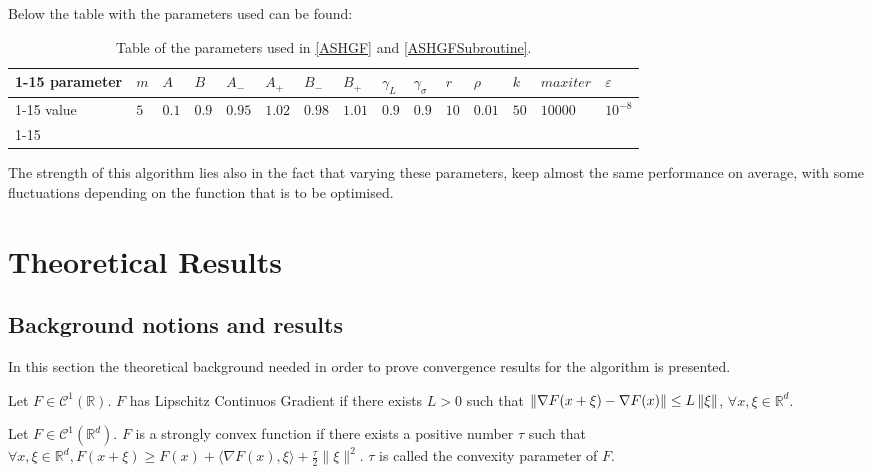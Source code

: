 Below the table with the parameters used can be found:

\begin{table}[!ht]
\hspace{-13mm}
\begin{tabular}{|l|llllllllllllll|}
\cline{1-15}
 parameter & $m$ & $A$   & $B$   & $A_-$ & $A_+$ & $B_-$ & $B_+$ & $\gamma_L$ & $\gamma_\sigma$ & $r$  & $\rho$ & $k$ & $maxiter$ & $\varepsilon$\\ \cline{1-15}
 value & $5$ & $0.1$ & $0.9$ & $0.95$ & $1.02$ & $0.98$ & $1.01$ & $0.9$ & $0.9$ & $10$ & $0.01$ & $50$ & $10000$ & $10^{-8}$            \\ \cline{1-15}
\end{tabular}
\caption[Table of the parameters.]{Table of the parameters used in \ref{ASHGF} and \ref{ASHGFSubroutine}.}
\end{table}

The strength of this algorithm lies also in the fact that varying these parameters, keep almost the same performance on average, with some fluctuations depending on the function that is to be optimised.

\section{Theoretical Results}

\subsection{Background notions and results}

In this section the theoretical background needed in order to prove convergence results for the algorithm is presented.

\begin{defn}\label{LipschitzContinousGradient}
Let $F\in\mathcal{C}^1 (\mathbb{R})$. $F$ has Lipschitz Continuos Gradient if there exists $L>0$ such that $\left\lVert\nabla F(x+\xi) - \nabla F(x)\right\rVert \leq L \left\lVert\xi\right\rVert$, $\forall x, \xi \in \mathbb{R}^d$.
\end{defn}

\begin{defn}
Let $F\in\mathcal{C}^1 (\mathbb{R}^d)$. $F$ is a strongly convex function if there exists a positive number $\tau$ such that $\forall x, \xi \in \mathbb{R}^{d}, F(x+\xi) \geq F(x)+\langle\nabla F(x), \xi\rangle+\frac{\tau}{2}\|\xi\|^{2}$. $\tau$ is called the convexity parameter of $F$.
\end{defn}

